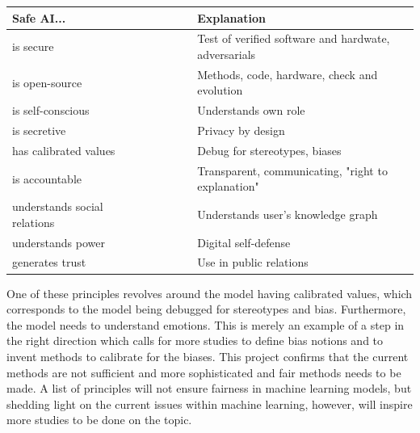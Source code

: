 \documentclass[11pt, fleqn, titlepage]{article}
\begin{document}
	
	\begin{table}[H]
		\centering
		\begin{tabular}{l  l  l l l  l  l}
			\toprule
			Safe AI...                 & & & & & & Explanation \\ \midrule
			is secure                     & & & & & & Test of verified software and hardwate, adversarials \\
			is open-source                & & & & & & Methods, code, hardware, check and evolution         \\
			is self-conscious             & & & & & & Understands own role                                 \\
			is secretive                  & & & & & & Privacy by design                                    \\
			has calibrated values      & & & & & & Debug for stereotypes, biases                        \\
			is accountable             & & & & & & Transparent, communicating, "right to explanation"   \\
			understands social relations& & & & & & Understands user's knowledge graph                   \\
			understands power          & & & & & & Digital self-defense                                 \\
			generates trust            & & & & & & Use in public relations                              \\ \bottomrule
		\end{tabular}
	\end{table} 
	\noindent
	One of these principles revolves around the model having calibrated values, which corresponds to the model being debugged for stereotypes and bias. Furthermore, the model needs to understand emotions. This is merely an example of a step in the right direction which calls for more studies to define bias notions and to invent methods to calibrate for the biases. This project confirms that the current methods are not sufficient and more sophisticated and fair methods needs to be made. A list of principles will not ensure fairness in machine learning models, but shedding light on the current issues within machine learning, however, will inspire more studies to be done on the topic.
	

	
\end{document}

